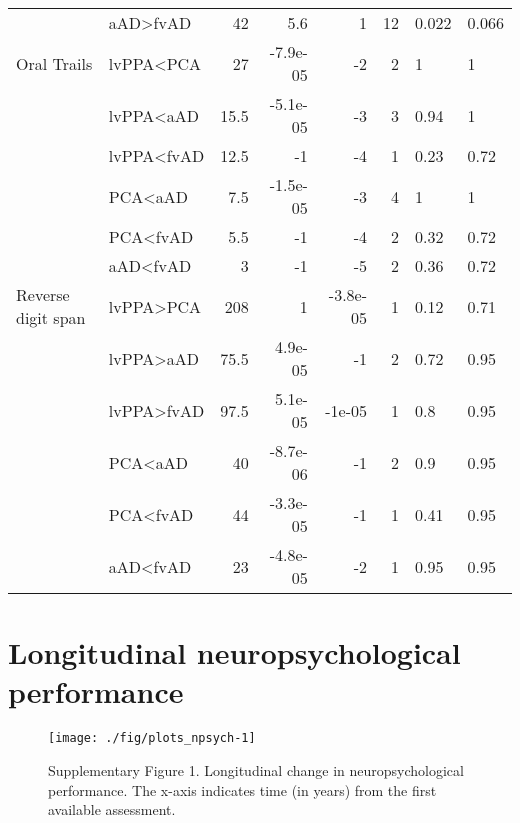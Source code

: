 \documentclass[]{article}
\begin{document}
\begin{table}[ht]
{\begin{tabular}{llrrrrll}
   & aAD>fvAD & 42 & 5.6 & 1 & 12 & 0.022 & 0.066 \\ 
  Oral Trails & lvPPA<PCA & 27 & -7.9e-05 & -2 & 2 & 1 & 1 \\ 
   & lvPPA<aAD & 15.5 & -5.1e-05 & -3 & 3 & 0.94 & 1 \\ 
   & lvPPA<fvAD & 12.5 & -1 & -4 & 1 & 0.23 & 0.72 \\ 
   & PCA<aAD & 7.5 & -1.5e-05 & -3 & 4 & 1 & 1 \\ 
   & PCA<fvAD & 5.5 & -1 & -4 & 2 & 0.32 & 0.72 \\ 
   & aAD<fvAD & 3 & -1 & -5 & 2 & 0.36 & 0.72 \\ 
  Reverse digit span & lvPPA>PCA & 208 & 1 & -3.8e-05 & 1 & 0.12 & 0.71 \\ 
   & lvPPA>aAD & 75.5 & 4.9e-05 & -1 & 2 & 0.72 & 0.95 \\ 
   & lvPPA>fvAD & 97.5 & 5.1e-05 & -1e-05 & 1 & 0.8 & 0.95 \\ 
   & PCA<aAD & 40 & -8.7e-06 & -1 & 2 & 0.9 & 0.95 \\ 
   & PCA<fvAD & 44 & -3.3e-05 & -1 & 1 & 0.41 & 0.95 \\ 
   & aAD<fvAD & 23 & -4.8e-05 & -2 & 1 & 0.95 & 0.95 \\ 
   \hline
\end{tabular}
}
\end{table}

\section*{Longitudinal neuropsychological
performance}\label{longitudinal-neuropsychological-performance}

\begin{figure}

{\centering \texttt{[image: ./fig/plots\_npsych-1]} 

}

\caption{Supplementary Figure 1. Longitudinal change in neuropsychological performance. The x-axis indicates time (in years) from the first available assessment.}\label{fig:plots_npsych}
\end{figure}
\end{document}
